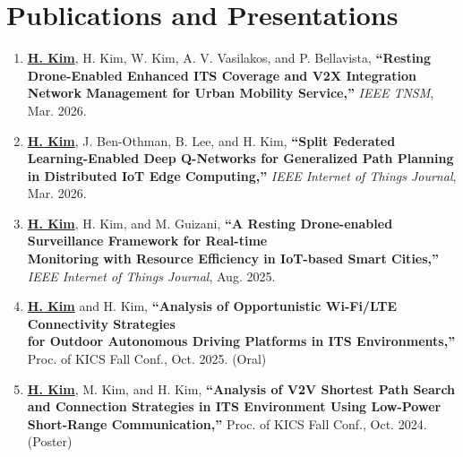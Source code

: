 \documentclass[a4paper,11pt]{article}
\begin{document}
\section{\textbf{Publications and Presentations}}
\small{
  \begin{enumerate}[itemsep=0.8em]

    \item \textbf{\underline{H. Kim}}, H. Kim, W. Kim, A. V. Vasilakos, and P. Bellavista,
    \textbf{``Resting Drone-Enabled Enhanced ITS Coverage and V2X Integration Network Management for Urban Mobility Service,''}
    \textit{IEEE TNSM}, Mar. 2026.
    \vspace{0.5em}

    \item \textbf{\underline{H. Kim}}, J. Ben-Othman, B. Lee, and H. Kim,
    \textbf{``Split Federated Learning-Enabled Deep Q-Networks for Generalized Path Planning in Distributed IoT Edge Computing,''}
    \textit{IEEE Internet of Things Journal}, Mar. 2026.
    \vspace{0.5em}

    \item \textbf{\underline{H. Kim}}, H. Kim, and M. Guizani,
    \textbf{``A Resting Drone-enabled Surveillance Framework for Real-time \\
    Monitoring with Resource Efficiency in IoT-based Smart Cities,''}
    \textit{IEEE Internet of Things Journal}, Aug. 2025.
    \vspace{0.5em}

    \item \textbf{\underline{H. Kim}} and H. Kim,
    \textbf{``Analysis of Opportunistic Wi-Fi/LTE Connectivity Strategies \\
    for Outdoor Autonomous Driving Platforms in ITS Environments,''}
    Proc. of KICS Fall Conf., Oct. 2025. (Oral)
    \vspace{0.5em}

    \item \textbf{\underline{H. Kim}}, M. Kim, and H. Kim,
    \textbf{``Analysis of V2V Shortest Path Search and Connection Strategies in ITS Environment Using Low-Power Short-Range Communication,''}
    Proc. of KICS Fall Conf., Oct. 2024. (Poster)

  \end{enumerate}
}
\end{document}
